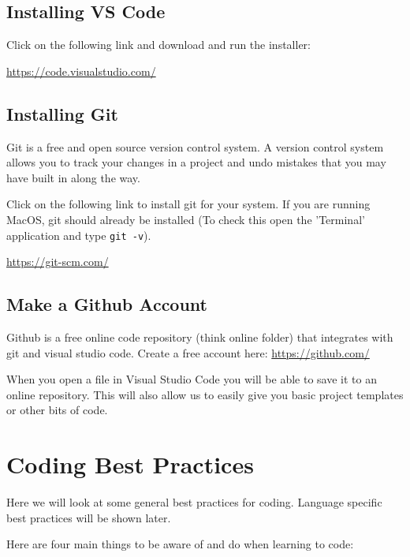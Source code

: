 \documentclass[english,11pt,a4paper]{report}
\begin{document}
\subsection{Installing VS Code}
Click on the following link and download and run the installer: 

\url{https://code.visualstudio.com/}

\subsection{Installing Git}
Git is a free and open source version control system. A version control system allows you to track your changes in a project and undo mistakes that you may have built in along the way. 

Click on the following link to install git for your system. If you are running MacOS, git should already be installed (To check this open the 'Terminal' application and type \verb|git -v|).

\url{https://git-scm.com/}

\subsection{Make a Github Account}
Github is a free online code repository (think online folder) that integrates with git and visual studio code. Create a free account here: \url{https://github.com/}

When you open a file in Visual Studio Code you will be able to save it to an online repository. This will also allow us to easily give you basic project templates or other bits of code.

\newpage
\section{Coding Best Practices}

Here we will look at some general best practices for coding. Language specific best practices will be shown later.

Here are four main things to be aware of and do when learning to code: 
\end{document}

